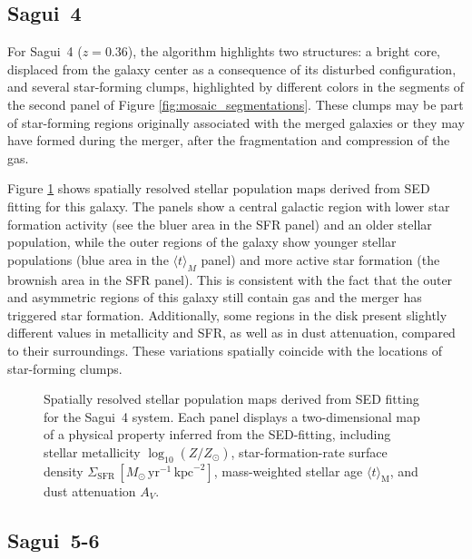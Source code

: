 \documentclass[fleqn,usenatbib]{mnras}
\begin{document}
\subsection{Sagui~4}
For Sagui~4 ($z=0.36$), the algorithm highlights two structures: a bright core, displaced from the galaxy center as a consequence of its disturbed configuration, and several star-forming clumps, highlighted by different colors in the segments of the second panel of Figure \ref{fig:mosaic_segmentations}. These clumps may be part of star-forming regions originally associated with the merged galaxies or they may have formed during the merger, after the fragmentation and compression of the gas. 

Figure \ref{fig:starlet_sagui4} shows spatially resolved stellar population maps derived from SED fitting for this galaxy. The panels show a central galactic region with lower star formation activity (see the bluer area in the SFR panel) and an older stellar population, while the outer regions of the galaxy show younger stellar populations (blue area in the $\langle t \rangle_{M}$ panel) and more active star formation (the brownish area in the SFR panel). This is consistent with the fact that the outer and asymmetric regions of this galaxy still contain gas and the merger has triggered star formation. Additionally, some regions in the disk present slightly different values in metallicity and SFR, as well as in dust attenuation, compared to their surroundings. These variations spatially coincide with the locations of star-forming clumps.


\begin{figure}
\centering
{}
\caption{Spatially resolved stellar population maps derived from SED fitting for the Sagui~4 system. Each panel displays a two-dimensional map of a physical property inferred from the SED-fitting, including stellar metallicity $\log_{10}(Z/Z_\odot)$, star-formation-rate surface density $\Sigma_{\mathrm{SFR}}\,[M_\odot\,\mathrm{yr}^{-1}\,\mathrm{kpc}^{-2}]$, mass-weighted stellar age $\langle t\rangle_{\mathrm{M}}$, and dust attenuation $A_V$.}
\label{fig:starlet_sagui4}
\end{figure}


\subsection{Sagui~5-6}
\end{document}
